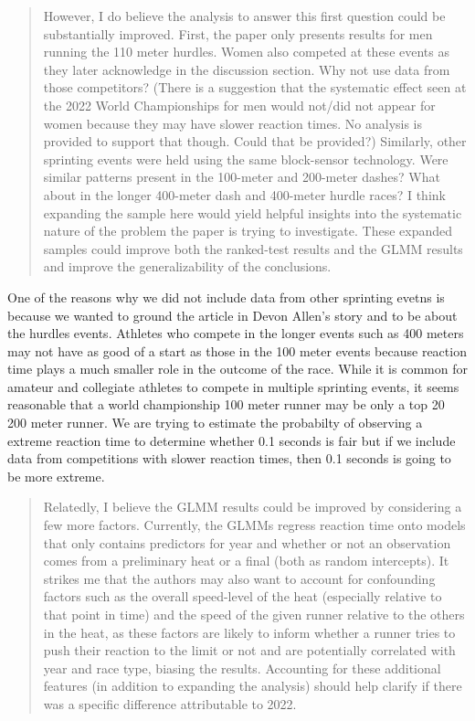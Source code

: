 \documentclass[12pt]{article}
\newenvironment{comment}%
{\begin{quotation}\noindent\small\it\color{darkblue}\ignorespaces%
}{\end{quotation}}
\begin{document}
\begin{comment}
However, I do believe the analysis to answer this first question could be
substantially improved. First, the paper only presents results for men running
the 110 meter hurdles. Women also competed at these events as they later
acknowledge in the discussion section. Why not use data from those competitors?
(There is a suggestion that the systematic effect seen at the 2022 World
Championships for men would not/did not appear for women because they may have
slower reaction times. No analysis is provided to support that though. Could
that be provided?) Similarly, other sprinting events were held using the same
block-sensor technology. Were similar patterns present in the 100-meter and
200-meter dashes? What about in the longer 400-meter dash and 400-meter hurdle
races? I think expanding the sample here would yield helpful insights into the
systematic nature of the problem the paper is trying to investigate. These
expanded samples could improve both the ranked-test results and the GLMM results
and improve the generalizability of the conclusions.
\end{comment}


One of the reasons why we did not include data from other sprinting evetns is
because we wanted to ground the article in Devon Allen's story and to be about
the hurdles events.  Athletes who compete in the longer events such as 400 meters
may not have as good of a start as those in the 100 meter events because reaction
time plays a much smaller role in the outcome of the race. While it is common
for amateur and collegiate athletes to compete in multiple sprinting events, it
seems reasonable that a world championship 100 meter runner may be only a top 20
200 meter runner.  We are trying to estimate the probabilty of observing a extreme
reaction time to determine whether 0.1 seconds is fair but if we include data
from competitions with slower reaction times, then 0.1 seconds is going to be
more extreme.


\begin{comment}

  
Relatedly, I believe the GLMM results could be improved by considering a few
more factors. Currently, the GLMMs regress reaction time onto models that only
contains predictors for year and whether or not an observation comes from a
preliminary heat or a final (both as random intercepts). It strikes me that the
authors may also want to account for confounding factors such as the overall
speed-level of the heat (especially relative to that point in time) and the
speed of the given runner relative to the others in the heat, as these factors
are likely to inform whether a runner tries to push their reaction to the limit
or not and are potentially correlated with year and race type, biasing the
results. Accounting for these additional features (in addition to expanding the
analysis) should help clarify if there was a specific difference attributable to
2022.
\end{comment} 
\end{document}
